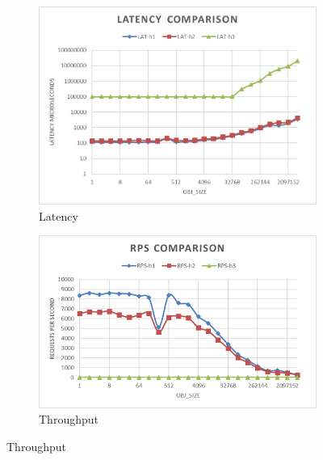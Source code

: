 \documentclass[runningheads]{llncs}
\begin{document}
\begin{figure}[!bt]
    \centering
  \begin{subfigure}[t]{0.49\textwidth}
        \includegraphics[width=1\textwidth]{lat-h2load-mistral.png}\vspace{-0.5em}
        \caption{Latency}
        \label {fig:lat-comp-mistral}
  \end{subfigure}
  \begin{subfigure}[t]{0.49\textwidth}
\includegraphics[width=1\textwidth]{rps-h2load-mistral.png}\vspace{-0.5em}
        \caption{Throughput}
		\label {fig:rps-comp-mistral}
  \end{subfigure}


\end{figure}
\end{document}

